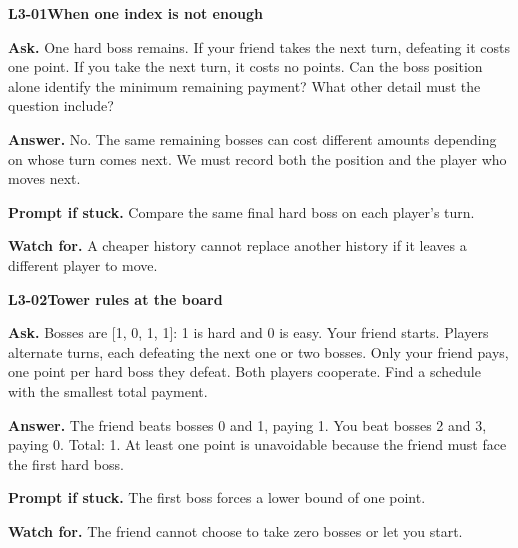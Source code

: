 \documentclass[11pt,a4paper]{article}
\begin{document}
\noindent\begin{minipage}{\textwidth}
{\color{teal}\textbf{L3-01}}\quad \textbf{When one index is not enough}\par\smallskip
\textbf{Ask.} One hard boss remains. If your friend takes the next turn, defeating it costs one point. If you take the next turn, it costs no points. Can the boss position alone identify the minimum remaining payment? What other detail must the question include?\par\smallskip
\textbf{Answer.} No. The same remaining bosses can cost different amounts depending on whose turn comes next. We must record both the position and the player who moves next.\par\smallskip
\textbf{Prompt if stuck.} Compare the same final hard boss on each player's turn.\par\smallskip
\textbf{Watch for.} A cheaper history cannot replace another history if it leaves a different player to move.
\end{minipage}\par{}\medskip

\noindent\begin{minipage}{\textwidth}
{\color{teal}\textbf{L3-02}}\quad \textbf{Tower rules at the board}\par\smallskip
\textbf{Ask.} Bosses are [1, 0, 1, 1]: 1 is hard and 0 is easy. Your friend starts. Players alternate turns, each defeating the next one or two bosses. Only your friend pays, one point per hard boss they defeat. Both players cooperate. Find a schedule with the smallest total payment.\par\smallskip
\textbf{Answer.} The friend beats bosses 0 and 1, paying 1. You beat bosses 2 and 3, paying 0. Total: 1. At least one point is unavoidable because the friend must face the first hard boss.\par\smallskip
\textbf{Prompt if stuck.} The first boss forces a lower bound of one point.\par\smallskip
\textbf{Watch for.} The friend cannot choose to take zero bosses or let you start.
\end{minipage}\par{}\medskip
\end{document}
